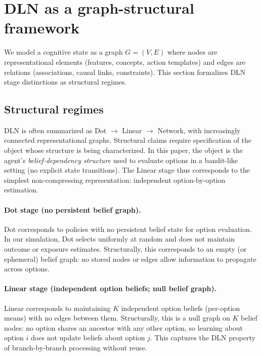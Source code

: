\documentclass[11pt]{article}
\begin{document}
\section{DLN as a graph-structural framework}

We model a cognitive state as a graph $G=(V,E)$ where nodes are representational elements (features, concepts, action templates) and edges are relations (associations, causal links, constraints). This section formalizes DLN stage distinctions as structural regimes.

\subsection{Structural regimes}

DLN is often summarized as Dot $\rightarrow$ Linear $\rightarrow$ Network, with increasingly connected representational graphs. Structural claims require specification of the object whose structure is being characterized. In this paper, the object is the agent's \emph{belief-dependency structure} used to evaluate options in a bandit-like setting (no explicit state transitions). The Linear stage thus corresponds to the simplest non-compressing representation: independent option-by-option estimation.

\paragraph{Dot stage (no persistent belief graph).}
Dot corresponds to policies with no persistent belief state for option evaluation. In our simulation, Dot selects uniformly at random and does not maintain outcome or exposure estimates.
Structurally, this corresponds to an empty (or ephemeral) belief graph: no stored nodes or edges allow information to propagate across options.

\paragraph{Linear stage (independent option beliefs; null belief graph).}
Linear corresponds to maintaining $K$ independent option beliefs (per-option means) with no edges between them.
Structurally, this is a null graph on $K$ belief nodes: no option shares an ancestor with any other option, so learning about option $i$ does not update beliefs about option $j$.
This captures the DLN property of branch-by-branch processing without reuse.
\end{document}

